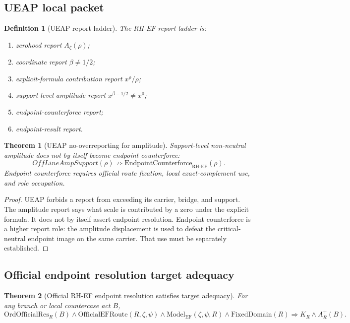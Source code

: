 \documentclass[11pt]{article}
\newtheorem{definition}{Definition}[section]
\newtheorem{theorem}{Theorem}[section]
\newcommand{\Az}{A_{\zeta}}
\newcommand{\RH}{\mathrm{RH}}
\newcommand{\EF}{\mathrm{EF}}
\newcommand{\FixedDomain}{\mathrm{FixedDomain}}
\newcommand{\Aplus}{A^+}
\newcommand{\ModelEF}{\mathrm{Model}_{\mathrm{EF}}}
\newcommand{\OfficialEFRoute}{\mathrm{OfficialEFRoute}}
\newcommand{\Counterforce}{\mathrm{EndpointCounterforce}}
\newcommand{\OrdOfficialRes}{\mathrm{OrdOfficialRes}}
\begin{document}
\subsection{UEAP local packet}

\begin{definition}[UEAP report ladder]
The RH-EF report ladder is:
\begin{enumerate}
\item zerohood report \(\Az(\rho)\);
\item coordinate report \(\beta\ne 1/2\);
\item explicit-formula contribution report \(x^\rho/\rho\);
\item support-level amplitude report \(x^{\beta-1/2}\ne x^0\);
\item endpoint-counterforce report;
\item endpoint-result report.
\end{enumerate}
\end{definition}

\begin{theorem}[UEAP no-overreporting for amplitude]
Support-level non-neutral amplitude does not by itself become endpoint counterforce:
\[
OffLineAmpSupport(\rho)\not\Rightarrow \Counterforce_{\RH\text{-}\EF}(\rho).
\]
Endpoint counterforce requires official route fixation, local exact-complement use, and role occupation.
\end{theorem}

\begin{proof}
UEAP forbids a report from exceeding its carrier, bridge, and support.  The amplitude report says what scale is contributed by a zero under the explicit formula.  It does not by itself assert endpoint resolution.  Endpoint counterforce is a higher report role: the amplitude displacement is used to defeat the critical-neutral endpoint image on the same carrier.  That use must be separately established.
\end{proof}

\subsection{Official endpoint resolution target adequacy}

\begin{theorem}[Official RH-EF endpoint resolution satisfies target adequacy]
For any branch or local countercase act \(B\),
\[
\OrdOfficialRes_R(B)\wedge \OfficialEFRoute(R,\zeta,\psi)\wedge \ModelEF(\zeta,\psi,R)\wedge \FixedDomain(R)
\Rightarrow K_R\wedge \Aplus_R(B).
\]
\end{theorem}
\end{document}
